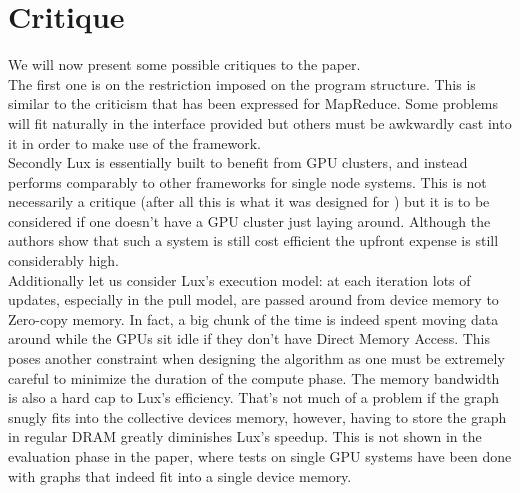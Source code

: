 \documentclass[]{article}
\begin{document}
\section{Critique}
We will now present some possible critiques to the paper.\\
The first one is on the restriction imposed on the program structure. This is similar to the criticism that has been expressed for MapReduce. Some problems will fit naturally in the interface provided but others must be awkwardly cast into it in order to make use of the framework.\\
Secondly Lux is essentially built to benefit from GPU clusters, and instead performs comparably to other frameworks for single node systems. This is not necessarily a critique (after all this is what it was designed for ) but it is to be considered if one doesn't have a GPU cluster just laying around. Although the authors show that such a system is still cost efficient the upfront expense is still considerably high.\\
Additionally let us consider Lux's execution model: at each iteration lots of updates, especially in the pull model, are passed around from device memory to Zero-copy memory. In fact, a big chunk of the time is indeed spent moving data around while the GPUs sit idle if they don't have Direct Memory Access. This poses another constraint when designing the algorithm as one must be extremely careful to minimize the duration of the compute phase. The memory bandwidth is also a hard cap to Lux's efficiency. That's not much of a problem if the graph snugly fits into the collective devices memory, however, having to store the graph in regular DRAM greatly diminishes Lux's speedup. This is not shown in the evaluation phase in the paper, where tests on single GPU systems have been done with graphs that indeed fit into a single device memory.\\
\end{document}
